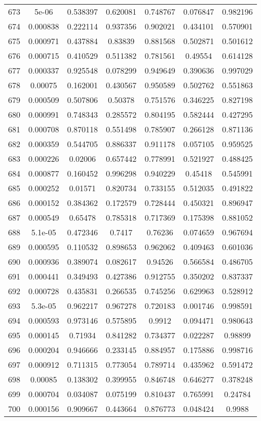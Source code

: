 \begin{table}
\begin{tabular}{c|c|c|c|c|c|c}
673 & 5e-06 & 0.538397 & 0.620081 & 0.748767 & 0.076847 & 0.982196\\
674 & 0.000838 & 0.222114 & 0.937356 & 0.902021 & 0.434101 & 0.570901\\
675 & 0.000971 & 0.437884 & 0.83839 & 0.881568 & 0.502871 & 0.501612\\
676 & 0.000715 & 0.410529 & 0.511382 & 0.781561 & 0.49554 & 0.614128\\
677 & 0.000337 & 0.925548 & 0.078299 & 0.949649 & 0.390636 & 0.997029\\
678 & 0.00075 & 0.162001 & 0.430567 & 0.950589 & 0.502762 & 0.551863\\
679 & 0.000509 & 0.507806 & 0.50378 & 0.751576 & 0.346225 & 0.827198\\
680 & 0.000991 & 0.748343 & 0.285572 & 0.804195 & 0.582444 & 0.427295\\
681 & 0.000708 & 0.870118 & 0.551498 & 0.785907 & 0.266128 & 0.871136\\
682 & 0.000359 & 0.544705 & 0.886337 & 0.911178 & 0.057105 & 0.959525\\
683 & 0.000226 & 0.02006 & 0.657442 & 0.778991 & 0.521927 & 0.488425\\
684 & 0.000877 & 0.160452 & 0.996298 & 0.940229 & 0.45418 & 0.545991\\
685 & 0.000252 & 0.01571 & 0.820734 & 0.733155 & 0.512035 & 0.491822\\
686 & 0.000152 & 0.384362 & 0.172579 & 0.728444 & 0.450321 & 0.896947\\
687 & 0.000549 & 0.65478 & 0.785318 & 0.717369 & 0.175398 & 0.881052\\
688 & 5.1e-05 & 0.472346 & 0.7417 & 0.76236 & 0.074659 & 0.967694\\
689 & 0.000595 & 0.110532 & 0.898653 & 0.962062 & 0.409463 & 0.601036\\
690 & 0.000936 & 0.389074 & 0.082617 & 0.94526 & 0.566584 & 0.486705\\
691 & 0.000441 & 0.349493 & 0.427386 & 0.912755 & 0.350202 & 0.837337\\
692 & 0.000728 & 0.435831 & 0.266535 & 0.745256 & 0.629963 & 0.528912\\
693 & 5.3e-05 & 0.962217 & 0.967278 & 0.720183 & 0.001746 & 0.998591\\
694 & 0.000593 & 0.973146 & 0.575895 & 0.9912 & 0.094471 & 0.980643\\
695 & 0.000145 & 0.71934 & 0.841282 & 0.734377 & 0.022287 & 0.98899\\
696 & 0.000204 & 0.946666 & 0.233145 & 0.884957 & 0.175886 & 0.998716\\
697 & 0.000912 & 0.711315 & 0.773054 & 0.789714 & 0.435962 & 0.591472\\
698 & 0.00085 & 0.138302 & 0.399955 & 0.846748 & 0.646277 & 0.378248\\
699 & 0.000704 & 0.034087 & 0.075199 & 0.810437 & 0.765991 & 0.24784\\
700 & 0.000156 & 0.909667 & 0.443664 & 0.876773 & 0.048424 & 0.9988\\
\end{tabular}
\end{table}
